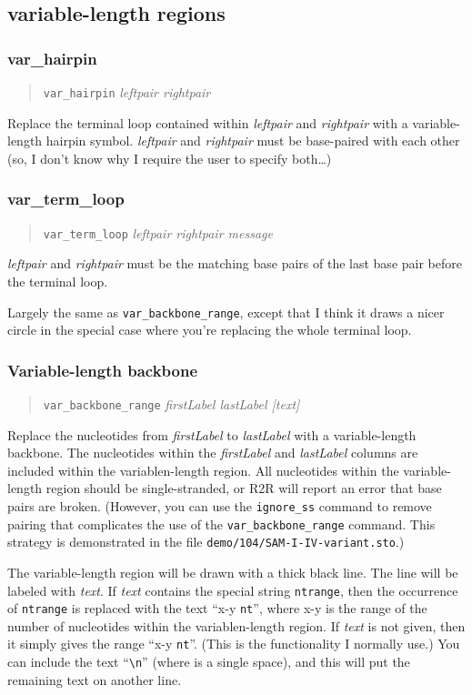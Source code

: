 \documentclass[letterpaper,12pt]{report}
\newcommand{\example}[1]{
\begin{quote}
{\raggedright
#1
}
\end{quote}
}
\begin{document}
\subsection{variable-length regions}
\label{sec:varlen}

\subsubsection{var\_hairpin}
\example{{\tt var\_hairpin}   \textit{leftpair  rightpair}}

Replace the terminal loop contained within \textit{leftpair } and
\textit{rightpair} with a variable-length hairpin symbol. 
\textit{leftpair} and \textit{rightpair} must be base-paired with each
other (so, I don{\textquoteright}t know why I require the user to
specify both{\dots})

\subsubsection{var\_term\_loop}
\example{{\tt var\_term\_loop}   \textit{leftpair  rightpair  message}}

\textit{leftpair } and \textit{rightpair }must be the matching base
pairs of the last base pair before the terminal loop.

Largely the same as {\tt var\_backbone\_range}, except that I think it draws a
nicer circle in the special case where you{\textquoteright}re replacing the whole terminal
loop.


\subsubsection{Variable-length backbone}
\example{{\tt var\_backbone\_range}  \textit{firstLabel  lastLabel [text]}}

Replace the nucleotides from \textit{firstLabel} to \textit{lastLabel}
 with a variable-length
backbone.  
The nucleotides within the {\it firstLabel} and {\it lastLabel}
columns are included within the variablen-length region.
All nucleotides within the variable-length region should be
single-stranded, or R2R will report an error that base pairs
are broken.
(However, you can use the {\tt ignore\_ss} command to remove pairing
that complicates the use of the {\tt var\_backbone\_range} command.
This strategy is demonstrated in the file {\tt demo/104/SAM-I-IV-variant.sto}.)

The variable-length region will be drawn with a thick black line.
The line will be labeled with
\textit{text}.  If \textit{text} contains the special string {\tt ntrange},
then the occurrence of {\tt ntrange} is replaced with the text {\textquotedblleft}x-y
{\tt nt}{\textquotedblright}, where x-y is the range of the number of nucleotides
within the variablen-length region.  If \textit{text} is not
given, then it simply gives the range ``x-y {\tt nt}''.  (This is the functionality
I normally use.)
You can include the text ``{\tt \textvisiblespace{}\textbackslash{}n\textvisiblespace{}}'' (where {\tt \textvisiblespace{}} is a single space), and this will put the remaining text on another line.
\end{document}
